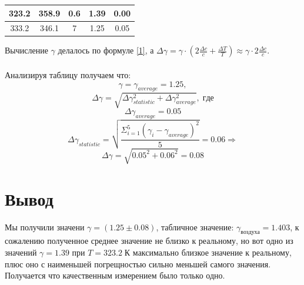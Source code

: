 \documentclass[12 pt, a4paper]{article}%
\begin{document}
\begin{enumerate}
\begin{center}
\begin{tabular}{|c|c|c|c|c|}
    323.2  & 358.9     & 0.6        & 1.39 & 0.00 \\ \hline
    333.2  & 346.1     & 7          & 1.25 & 0.05 \\ \hline
    \end{tabular}
    \end{center}
    Вычисление $\gamma$ делалось по формуле \ref{1}, а $\Delta \gamma = \gamma\cdot (2\frac{\Delta c}{c} + \frac{\Delta T}{T}) \approx \gamma\cdot 2\frac{\Delta c}{c}$. \\ \\
    Анализируя таблицу получаем что: $$\gamma = \gamma_{average} = 1.25,$$ $$ \Delta \gamma = \sqrt{\Delta \gamma_{statistic}^2 + \Delta \gamma_{average}^2},\;где$$
    $$\Delta \gamma_{average} = 0.05$$
    $$\Delta \gamma_{statistic} = \sqrt{\frac{\Sigma^5_{i = 1} (\gamma_i - \gamma_{average})^2}{5}} = 0.06 \Rightarrow$$
    $$\Delta \gamma =\sqrt{0.05^2 + 0.06^2} = 0.08$$    
\end{enumerate}

\section*{Вывод}
Мы получили значени $\gamma = (1.25\pm0.08)$, табличное значение: $\gamma_{воздуха} = 1.403$, к сожалению полученное среднее значение не близко к реальному, но вот одно из значений $\gamma = 1.39$ при $T = 323.2\;К$ максимально близкое значение к реальному, плюс оно с наименьшей погрещностью сильно меньшей самого значения. Получается что качественным измерением было только одно.
\end{document}
